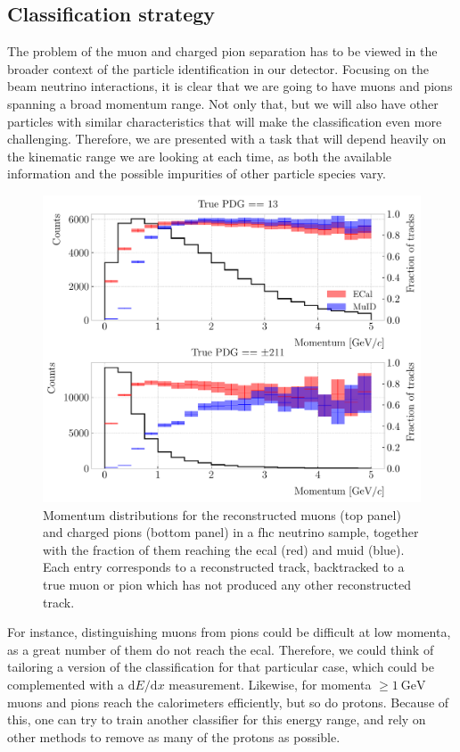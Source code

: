 \subsection{Classification strategy}

The problem of the muon and charged pion separation has to be viewed in the broader context of the particle identification in our detector. Focusing on the beam neutrino interactions, it is clear that we are going to have muons and pions spanning a broad momentum range. Not only that, but we will also have other particles with similar characteristics that will make the classification even more challenging. Therefore, we are presented with a task that will depend heavily on the kinematic range we are looking at each time, as both the available information and the possible impurities of other particle species vary.

\begin{figure}[t]
	\centering
	\includegraphics[width=.80\linewidth]{Images/GArSoft_PID/BDT/fraction_vs_preco_no_duplicates.pdf}
	\caption[Momentum distributions for the reconstructed muons and charged pions in a \gls{fhc} sample, together with the fraction of them reaching the \gls{ecal} and \gls{muid}.]{Momentum distributions for the reconstructed muons (top panel) and charged pions (bottom panel) in a \gls{fhc} neutrino sample, together with the fraction of them reaching the \gls{ecal} (red) and \gls{muid} (blue). Each entry corresponds to a reconstructed track, backtracked to a true muon or pion which has not produced any other reconstructed track.}
	\label{fig:fraction_particles_ecal_muid}
\end{figure}

For instance, distinguishing muons from pions could be difficult at low momenta, as a great number of them do not reach the \gls{ecal}. Therefore, we could think of tailoring a version of the classification for that particular case, which could be complemented with a $\mathrm{d}E/\mathrm{d}x$ measurement. Likewise, for momenta $\geq 1~\mathrm{GeV}$ muons and pions reach the calorimeters efficiently, but so do protons. Because of this, one can try to train another classifier for this energy range, and rely on other methods to remove as many of the protons as possible.

